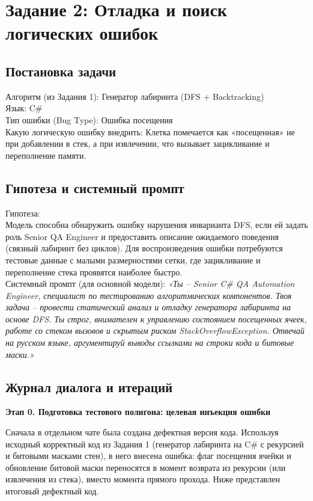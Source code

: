 \section*{Задание 2: Отладка и поиск логических ошибок}
\subsection{Постановка задачи}
Алгоритм (из Задания 1): Генератор лабиринта (DFS + Backtracking) \\
Язык: C\# \\
Тип ошибки (Bug Type): Ошибка посещения \\
Какую логическую ошибку внедрить: Клетка помечается как «посещенная» не при добавлении в стек, а при извлечении, что вызывает зацикливание и переполнение памяти.

\subsection{Гипотеза и системный промпт}
Гипотеза: \\
Модель способна обнаружить ошибку нарушения инварианта DFS, если ей задать роль Senior QA Engineer и предоставить описание ожидаемого поведения (связный лабиринт без циклов). Для воспроизведения ошибки потребуются тестовые данные с малыми размерностями сетки, где зацикливание и переполнение стека проявятся наиболее быстро.\\
\vspace{0.5em}
Системный промпт (для основной модели):
\textit{«Ты – Senior C\# QA Automation Engineer, специалист по тестированию алгоритмических компонентов. Твоя задача – провести статический анализ и отладку генератора лабиринта на основе DFS. Ты строг, внимателен к управлению состоянием посещенных ячеек, работе со стеком вызовов и скрытым риском StackOverflowException. Отвечай на русском языке, аргументируй выводы ссылками на строки кода и битовые маски.»}

\subsection{Журнал диалога и итераций}
\textbf{Этап 0. Подготовка тестового полигона: целевая инъекция ошибки}

Сначала в отдельном чате была создана дефектная версия кода. Используя исходный корректный код из Задания 1 (генератор лабиринта на C\# с рекурсией и битовыми масками стен), в него внесена ошибка: флаг посещения ячейки и обновление битовой маски переносятся в момент возврата из рекурсии (или извлечения из стека), вместо момента прямого прохода. Ниже представлен итоговый дефектный код.

